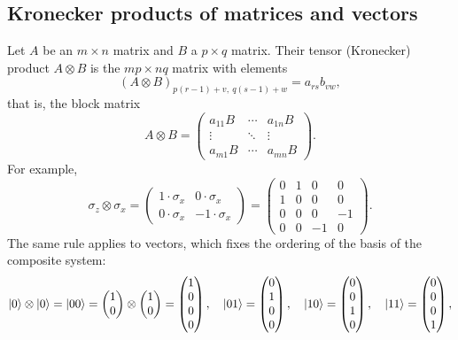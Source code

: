 \subsection{Kronecker products of matrices and vectors}
Let $A$ be an $m\times n$ matrix and $B$ a $p\times q$ matrix. Their tensor (Kronecker) product $A\otimes B$ is the $mp\times nq$ matrix with elements
\begin{equation}
  (A\otimes B)_{p(r-1)+v,\ q(s-1)+w}=a_{rs}b_{vw},
\end{equation}
that is, the block matrix
\begin{equation}
  A\otimes B=\begin{pmatrix}a_{11}B&\cdots&a_{1n}B\\ \vdots&\ddots&\vdots\\ a_{m1}B&\cdots&a_{mn}B\end{pmatrix}.
\end{equation}
For example,
\begin{equation}
  \sigma_z\otimes\sigma_x=\begin{pmatrix}1\cdot\sigma_x&0\cdot\sigma_x\\0\cdot\sigma_x&-1\cdot\sigma_x\end{pmatrix}
  =\begin{pmatrix}0&1&0&0\\1&0&0&0\\0&0&0&-1\\0&0&-1&0\end{pmatrix}.
\end{equation}
The same rule applies to vectors, which fixes the ordering of the basis of the composite system:
\begin{equation}
  \left|0\right\rangle\otimes\left|0\right\rangle=\left|00\right\rangle=\begin{pmatrix}1\\0\end{pmatrix}\otimes\begin{pmatrix}1\\0\end{pmatrix}=\begin{pmatrix}1\\0\\0\\0\end{pmatrix},\quad
  \left|01\right\rangle=\begin{pmatrix}0\\1\\0\\0\end{pmatrix},\quad\left|10\right\rangle=\begin{pmatrix}0\\0\\1\\0\end{pmatrix},\quad\left|11\right\rangle=\begin{pmatrix}0\\0\\0\\1\end{pmatrix},
\end{equation}
